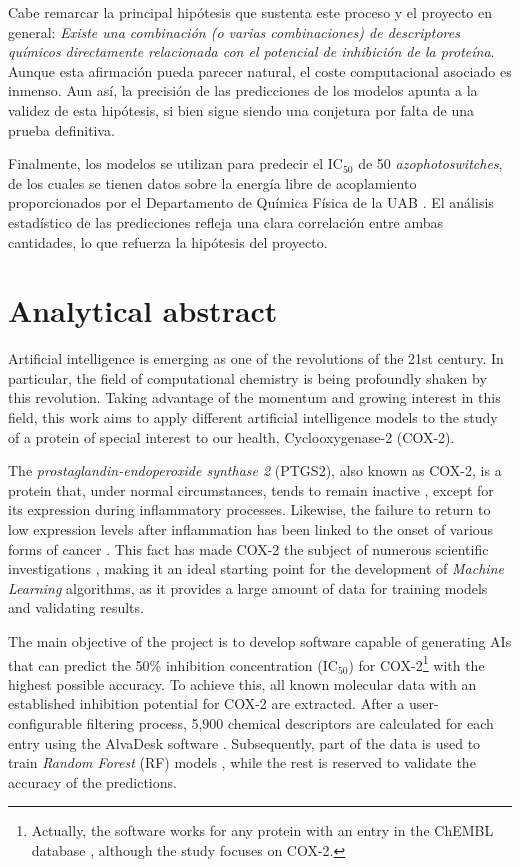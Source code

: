 \documentclass[11pt]{article}
\begin{document}
Cabe remarcar la principal hipótesis que sustenta este proceso y el proyecto en general: \emph{Existe una combinación (o varias combinaciones) de descriptores químicos directamente relacionada con el potencial de inhibición de la proteína}. Aunque esta afirmación pueda parecer natural, el coste computacional asociado es inmenso. Aun así, la precisión de las predicciones de los modelos apunta a la validez de esta hipótesis, si bien sigue siendo una conjetura por falta de una prueba definitiva.

Finalmente, los modelos se utilizan para predecir el IC$_{50}$ de 50 \emph{azophotoswitches}, de los cuales se tienen datos sobre la energía libre de acoplamiento proporcionados por el Departamento de Química Física de la UAB \cite{UAB_ComputationalChemistry}. El análisis estadístico de las predicciones refleja una clara correlación entre ambas cantidades, lo que refuerza la hipótesis del proyecto.

\newpage

\section*{Analytical abstract}
Artificial intelligence is emerging as one of the revolutions of the 21st century. In particular, the field of computational chemistry is being profoundly shaken by this revolution. Taking advantage of the momentum and growing interest in this field, this work aims to apply different artificial intelligence models to the study of a protein of special interest to our health, Cyclooxygenase-2 (COX-2).

The \emph{prostaglandin-endoperoxide synthase 2} (PTGS2), also known as COX-2, is a protein that, under normal circumstances, tends to remain inactive \cite{Cox2Location}, except for its expression during inflammatory processes. Likewise, the failure to return to low expression levels after inflammation has been linked to the onset of various forms of cancer \cite{DefinitionCOX2CancerDictionary}. This fact has made COX-2 the subject of numerous scientific investigations \cite{Cox2InhibitorsReview}, making it an ideal starting point for the development of \emph{Machine Learning} algorithms, as it provides a large amount of data for training models and validating results.

The main objective of the project is to develop software capable of generating AIs that can predict the 50\% inhibition concentration (IC$_{50}$) for COX-2\footnote{Actually, the software works for any protein with an entry in the ChEMBL database \cite{ChemblDatabase}, although the study focuses on COX-2.} with the highest possible accuracy. To achieve this, all known molecular data with an established inhibition potential for COX-2 are extracted. After a user-configurable filtering process, 5,900 chemical descriptors are calculated for each entry using the AlvaDesk software \cite{MauriMolecularDescriptorsBook}\cite{AlvaDescSecondPaper}. Subsequently, part of the data is used to train \emph{Random Forest} (RF) models \cite{MachineLearningRandomForest}, while the rest is reserved to validate the accuracy of the predictions.
\end{document}

